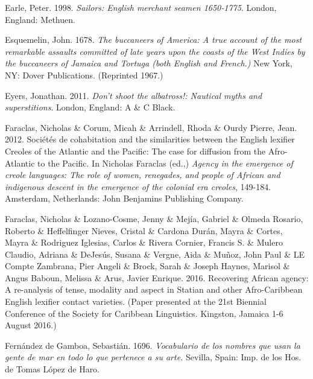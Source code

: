 \begin{styleStandard}
Earle, Peter. 1998. \textit{Sailors: English merchant seamen 1650-1775}. London, England: Methuen.
\end{styleStandard}


\begin{styleStandard}
Esquemelin, John. 1678. \textit{The buccaneers of America: A true account of the most remarkable assaults committed of late years upon the coasts of the West Indies by the buccaneers of Jamaica and Tortuga (both English and French.) }New York, NY: Dover Publications. (Reprinted 1967.)
\end{styleStandard}


\begin{styleStandard}
Eyers, Jonathan. 2011. \textit{Don’t shoot the albatross!: Nautical myths and superstitions}. London, England: A \& C Black.
\end{styleStandard}


\begin{styleStandard}
Faraclas, Nicholas \& Corum, Micah \& Arrindell, Rhoda \& Ourdy Pierre, Jean. 2012. Sociétés de cohabitation and the similarities between the English lexifier Creoles of the Atlantic and the Pacific: The case for diffusion from the Afro-Atlantic to the Pacific. In Nicholas Faraclas (ed.,) \textit{Agency in the emergence of creole languages: The role of women, renegades, and people of African and indigenous descent in the emergence of the colonial era creoles}, 149-184. Amsterdam, Netherlands: John Benjamins Publishing Company.
\end{styleStandard}


\begin{styleStandard}
Faraclas, Nicholas \& Lozano-Cosme, Jenny \& Mejía, Gabriel \& Olmeda Rosario, Roberto \& Heffelfinger Nieves, Cristal \& Cardona Durán, Mayra \& Cortes, Mayra \& Rodriguez Iglesias, Carlos \& Rivera Cornier, Francis S. \& Mulero Claudio, Adriana \& DeJesús, Susana \& Vergne, Aida \& Muñoz, John Paul \& LE Compte Zambrana, Pier Angeli \& Brock, Sarah \& Joseph Haynes, Marisol \& Angus Baboun, Melissa \& Arus, Javier Enrique. 2016. Recovering African agency: A re-analysis of tense, modality and aspect in Statian and other Afro-Caribbean English lexifier contact varieties. (Paper presented at the 21st Biennial Conference of the Society for Caribbean Linguistics. Kingston, Jamaica 1-6 August 2016.)
\end{styleStandard}


\begin{styleStandard}
Fernández de Gamboa, Sebastián. 1696. \textit{Vocabulario de los nombres que usan la gente de mar en todo lo que pertenece a su arte.} Sevilla, Spain: Imp. de los Hos. de Tomas López de Haro.
\end{styleStandard}


